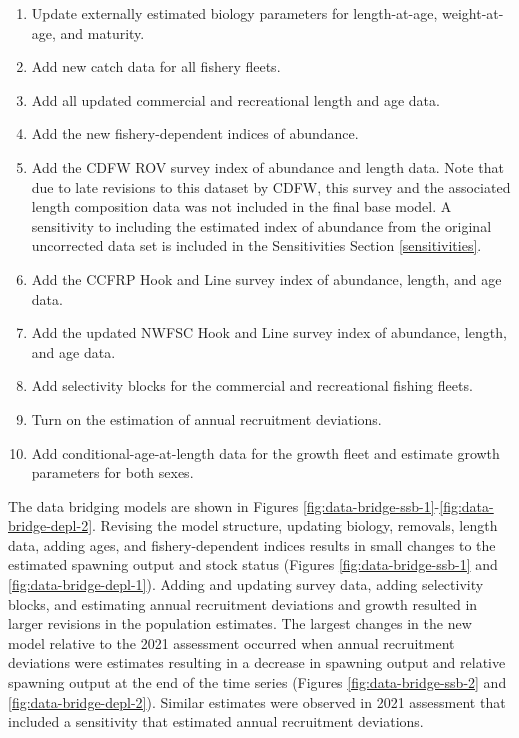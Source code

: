 \documentclass[11pt,
  english,
  letterpaper,
]{article}
\providecommand{\tightlist}{%
  \setlength{\itemsep}{0pt}\setlength{\parskip}{0pt}}
\providecommand{\tightlist}{%
  \setlength{\itemsep}{0pt}\setlength{\parskip}{0pt}}
\begin{document}
\begin{enumerate}
\def\labelenumi{\arabic{enumi}.}
\tightlist
\item
  Update externally estimated biology parameters for length-at-age, weight-at-age, and maturity.
\item
  Add new catch data for all fishery fleets.
\item
  Add all updated commercial and recreational length and age data.
\item
  Add the new fishery-dependent indices of abundance.
\item
  Add the CDFW ROV survey index of abundance and length data. Note that due to late revisions to this dataset by CDFW, this survey and the associated length composition data was not included in the final base model. A sensitivity to including the estimated index of abundance from the original uncorrected data set is included in the Sensitivities Section \ref{sensitivities}.
\item
  Add the CCFRP Hook and Line survey index of abundance, length, and age data.
\item
  Add the updated NWFSC Hook and Line survey index of abundance, length, and age data.
\item
  Add selectivity blocks for the commercial and recreational fishing fleets.
\item
  Turn on the estimation of annual recruitment deviations.
\item
  Add conditional-age-at-length data for the growth fleet and estimate growth parameters for both sexes.
\end{enumerate}

The data bridging models are shown in Figures \ref{fig:data-bridge-ssb-1}-\ref{fig:data-bridge-depl-2}. Revising the model structure, updating biology, removals, length data, adding ages, and fishery-dependent indices results in small changes to the estimated spawning output and stock status (Figures \ref{fig:data-bridge-ssb-1} and \ref{fig:data-bridge-depl-1}). Adding and updating survey data, adding selectivity blocks, and estimating annual recruitment deviations and growth resulted in larger revisions in the population estimates. The largest changes in the new model relative to the 2021 assessment occurred when annual recruitment deviations were estimates resulting in a decrease in spawning output and relative spawning output at the end of the time series (Figures \ref{fig:data-bridge-ssb-2} and \ref{fig:data-bridge-depl-2}). Similar estimates were observed in 2021 assessment that included a sensitivity that estimated annual recruitment deviations.
\end{document}
